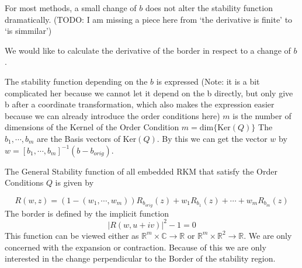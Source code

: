 \documentclass{article}
\begin{document}
For most methods, a small change of $b$ does not alter the stability function dramatically.
(TODO: I am missing a piece here from ‘the derivative is finite’ to ‘is simmilar’)

We would like to calculate the derivative of the border in respect to a change of $b$. 

The stability function depending on the $b$ is expressed (Note: it is a bit complicated her because we cannot let it depend on the b directly, but only give b after a coordinate transformation, which also makes the expression easier because we can already introduce the order conditions here)
$m$ is the number of dimensions of the Kernel of the Order Condition $m = \mathrm{dim}\{\mathrm{Ker} (Q) \}$
The $b_1,\cdots,b_m$  are the Basis vectors of $\mathrm{Ker} (Q)$. By this we can get the vector $w$ by $w = \left[b_1,\cdots,b_m\right]^{-1}(b-b_{orig})$.

The General Stability function of all embedded RKM that satisfy the Order Conditions $Q$ is given by 

\begin{equation}\label{eq:gen_stabilityf}
R(w,z) = (1-(w_1,\cdots,w_m))R_{b_{orig}}(z) + w_1 R_{b_1}(z) + \cdots + w_m R_{b_m}(z)
\end{equation}
The border is defined by the implicit function 
\begin{equation}\label{eq:border}
|R(w,u+iv)|^2 -1 = 0
\end{equation}
This function can be viewed either as $\mathbb{R}^m \times  \mathbb{C} \rightarrow \mathbb{R}$ or $\mathbb{R}^m \times  \mathbb{R}^2 \rightarrow \mathbb{R}$.
We are only concerned with the expansion or contraction. Because of this we are only interested in the change perpendicular to the Border of the stability region. 
\end{document}
